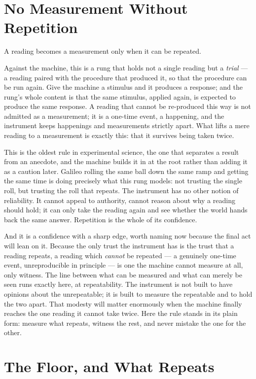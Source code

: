 \section{No Measurement Without Repetition}

A reading becomes a measurement only when it can be repeated.

Against the machine, this is a rung that holds not a single reading but a \emph{trial} --- a reading paired with
the procedure that produced it, so that the procedure can be run again. Give the machine a stimulus and it
produces a response; and the rung's whole content is that the same stimulus, applied again, is expected to
produce the same response. A reading that cannot be re-produced this way is not admitted as a measurement; it is
a one-time event, a happening, and the instrument keeps happenings and measurements strictly apart. What lifts a
mere reading to a measurement is exactly this: that it survives being taken twice.

This is the oldest rule in experimental science, the one that separates a result from an anecdote, and the
machine builds it in at the root rather than adding it as a caution later. Galileo rolling the same ball down the
same ramp and getting the same time is doing precisely what this rung models: not trusting the single roll, but
trusting the roll that repeats. The instrument has no other notion of reliability. It cannot appeal to
authority, cannot reason about why a reading should hold; it can only take the reading again and see whether the
world hands back the same answer. Repetition is the whole of its confidence.

And it is a confidence with a sharp edge, worth naming now because the final act will lean on it. Because
the only trust the instrument has is the trust that a reading repeats, a reading which \emph{cannot} be repeated
--- a genuinely one-time event, unreproducible in principle --- is one the machine cannot measure at all, only
witness. The line between what can be measured and what can merely be seen runs exactly here, at repeatability.
The instrument is not built to have opinions about the unrepeatable; it is built to measure the repeatable and to
hold the two apart. That modesty will matter enormously when the machine finally reaches the one reading it
cannot take twice. Here the rule stands in its plain form: measure
what repeats, witness the rest, and never mistake the one for the other.

\section{The Floor, and What Repeats}

